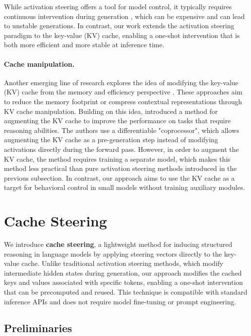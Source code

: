 \documentclass{article} %
\begin{document}
While activation steering offers a tool for model control, it typically requires continuous intervention during generation \citep{wehner2025taxonomy}, which can be expensive and can lead to unstable generations. In contrast, our work extends the activation steering paradigm to the key-value (KV) cache, enabling a one-shot intervention that is both more efficient and more stable at inference time.


\paragraph{Cache manipulation.}
Another emerging line of research explores the idea of modifying the key-value (KV) cache from the memory and efficiency perspective \citep{li2024snapkv, liu2024clusterkv, ge2023context, mu2023learning}. These approaches aim to reduce the memory footprint or compress contextual representations through KV cache manipulation. Building on this idea, \citet{liu2024deliberation} introduced a method for augmenting the KV cache to improve the performance on tasks that require reasoning abilities. The authors use a differentiable "coprocessor", which allows augmenting the KV cache as a pre-generation step instead of modifying activations directly during the forward pass. However, in order to augment the KV cache, the method requires training a separate model, which makes this method less practical than pure activation steering methods introduced in the previous subsection.
In contrast, our approach aims to use the KV cache as a target for behavioral control in small models without training auxiliary modules.

\section{Cache Steering}
\label{sec:method}

We introduce \textbf{cache steering}, a lightweight method for inducing structured reasoning in language models by applying steering vectors directly to the key-value cache. Unlike traditional activation steering methods, which modify intermediate hidden states during generation, our approach modifies the cached keys and values associated with specific tokens, enabling a one-shot intervention that can be precomputed and reused. This technique is compatible with standard inference APIs and does not require model fine-tuning or prompt engineering.


\subsection{Preliminaries} \label{subsec:prelims}
\end{document}
